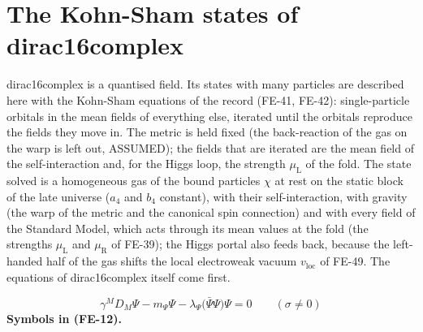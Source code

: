 \documentclass[
  10pt,
]{article}
\begin{document}
\hypertarget{the-kohn-sham-states-of-dirac16complex}{%
\section{The Kohn-Sham states of
dirac16complex}\label{the-kohn-sham-states-of-dirac16complex}}

dirac16complex is a quantised field. Its states with many particles are
described here with the Kohn-Sham equations of the record (FE-41,
FE-42): single-particle orbitals in the mean fields of everything else,
iterated until the orbitals reproduce the fields they move in. The
metric is held fixed (the back-reaction of the gas on the warp is left
out, ASSUMED); the fields that are iterated are the mean field of the
self-interaction and, for the Higgs loop, the strength
\(\mu_{\mathrm{L}}\) of the fold. The state solved is a homogeneous gas
of the bound particles \(\chi\) at rest on the static block of the late
universe (\(a_4\) and \(b_4\) constant), with their self-interaction,
with gravity (the warp of the metric and the canonical spin connection)
and with every field of the Standard Model, which acts through its mean
values at the fold (the strengths \(\mu_{\mathrm{L}}\) and
\(\mu_{\mathrm{R}}\) of FE-39); the Higgs portal also feeds back,
because the left-handed half of the gas shifts the local electroweak
vacuum \(v_{\mathrm{loc}}\) of FE-49. The equations of dirac16complex
itself come first.

\[
\gamma^MD_M\Psi - m_\Psi\Psi - \lambda_\Psi\big(\bar\Psi\Psi\big)\Psi = 0\qquad (\sigma \ne 0) \tag{FE-12}
\] \textbf{Symbols in (FE-12).}
\end{document}
